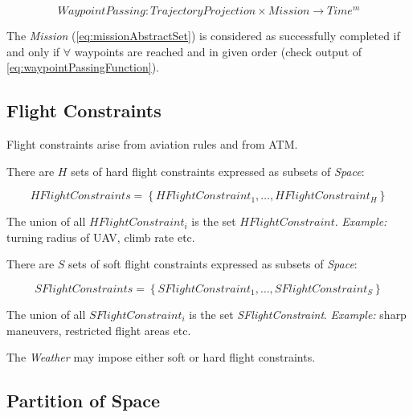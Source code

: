     \begin{equation}\label{eq:waypointPassingFunction}
        WaypointPassing:TrajectoryProjection \times Mission \to Time^m
    \end{equation}

    \begin{note}
        The \emph{Mission} (\ref{eq:missionAbstractSet}) is considered as successfully completed if and only if $\forall$ waypoints are reached and in given order (check output of \ref{eq:waypointPassingFunction}).
    \end{note}



\subsection{Flight Constraints}\label{s:FlightConstraints}

    \noindent Flight constraints arise from aviation rules and from ATM. 

    There are $H$ sets of hard flight constraints expressed as subsets of \emph{Space}:

    \begin{equation}\label{eq:HFlightConstraints}
        HFlightConstraints=\left\{HFlightConstraint_1, \dots, HFlightConstraint_H \right\}
    \end{equation}

    The union of all \emph{$HFlightConstraint_i$} is the set \emph{$HFlightConstraint$}. \emph{Example:} turning radius of UAV, climb rate etc. 
    
    There are $S$ sets of soft flight constraints expressed as subsets of \emph{Space}:

    \begin{equation}\label{eq:SFlightConstraints}
        SFlightConstraints=\left\{SFlightConstraint_1, \dots, SFlightConstraint_S \right\}
    \end{equation}

    The union of all \emph{$SFlightConstraint_i$} is the set \emph{SFlightConstraint}. \emph{Example:} sharp maneuvers, restricted flight areas etc.

    The \emph{Weather} may impose either soft or hard flight constraints.



\subsection{Partition of Space}\label{s:partitionOfSpace}

